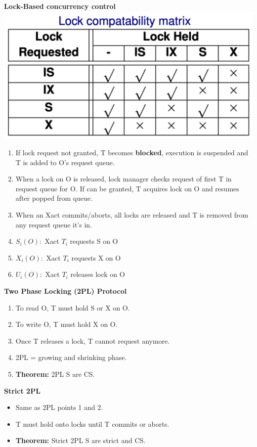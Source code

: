 \documentclass[8pt, landscape]{extarticle}
\begin{document}
\begin{multicols*}{4}
  \textbf{Lock-Based concurrency control}
  \includegraphics[width=0.4\linewidth]{cs3223-lock-matrix.png}
  \begin{enumerate}
    \item If lock request not granted, T becomes \textbf{blocked}, execution is suspended and T is added to O's request queue.
    \item When a lock on O is released, lock manager checks request of first T in request queue for O. If can be granted, T acquires lock on O and resumes after popped from queue.
    \item When an Xact commits/aborts, all locks are released and T is removed from any request queue it's in.
    \item $S_i(O):$ Xact $T_i$ requests S on O
    \item $X_i(O):$ Xact $T_i$ requests X on O
    \item $U_i(O):$ Xact $T_i$ releases lock on O
  \end{enumerate}

  \textbf{Two Phase Locking (2PL) Protocol}
  \begin{enumerate}
    \item To read O, T must hold S or X on O.
    \item To write O, T must hold X on O.
    \item Once T releases a lock, T cannot request anymore.
    \item 2PL = growing and shrinking phase.
    \item \textbf{Theorem:} 2PL S are CS.
  \end{enumerate}

  \textbf{Strict 2PL}
  \begin{itemize}
    \item Same as 2PL points 1 and 2.
    \item T must hold onto locks until T commits or aborts.
    \item \textbf{Theorem:} Strict 2PL S are strict and CS.
  \end{itemize}


\end{multicols*}
\end{document}
